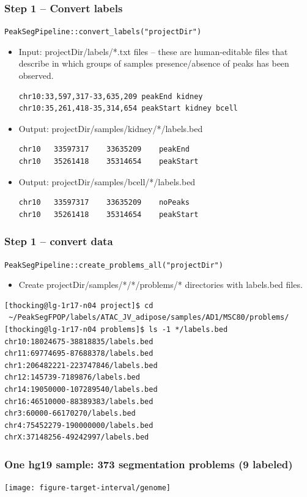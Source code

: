 \documentclass{beamer}
\begin{document}
\begin{frame}
  \frametitle{Step 1 -- Convert labels}
  \verb|PeakSegPipeline::convert_labels("projectDir")|
  \begin{itemize}
  \item Input: projectDir/labels/*.txt files -- these are human-editable
    files that describe in which groups of samples presence/absence of
    peaks has been observed.
\begin{verbatim}
chr10:33,597,317-33,635,209 peakEnd kidney
chr10:35,261,418-35,314,654 peakStart kidney bcell
\end{verbatim}
  \item Output: projectDir/samples/kidney/*/labels.bed
\begin{verbatim}
chr10	33597317	33635209	peakEnd
chr10	35261418	35314654	peakStart
\end{verbatim}
  \item Output: projectDir/samples/bcell/*/labels.bed
\begin{verbatim}
chr10	33597317	33635209	noPeaks
chr10	35261418	35314654	peakStart
\end{verbatim}
\end{itemize}
\end{frame}

\begin{frame}
  \frametitle{Step 1 -- convert data}
  \verb|PeakSegPipeline::create_problems_all("projectDir")|
  \begin{itemize}
  \item Create projectDir/samples/*/*/problems/* directories with
    labels.bed files.
  \end{itemize}
\small
\begin{verbatim}
[thocking@lg-1r17-n04 project]$ cd
 ~/PeakSegFPOP/labels/ATAC_JV_adipose/samples/AD1/MSC80/problems/
[thocking@lg-1r17-n04 problems]$ ls -1 */labels.bed
chr10:18024675-38818835/labels.bed
chr11:69774695-87688378/labels.bed
chr1:206482221-223747846/labels.bed
chr12:145739-7189876/labels.bed
chr14:19050000-107289540/labels.bed
chr16:46510000-88389383/labels.bed
chr3:60000-66170270/labels.bed
chr4:75452279-190000000/labels.bed
chrX:37148256-49242997/labels.bed
\end{verbatim}
\end{frame}

\begin{frame}
  \frametitle{One hg19 sample: 373 segmentation problems (9 labeled)}
  \texttt{[image: figure-target-interval/genome]} 
\end{frame}
\end{document}
